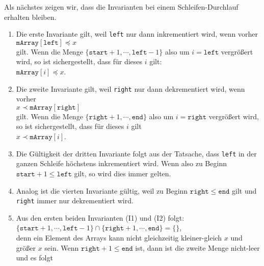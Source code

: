 \noindent
Als n\"achstes zeigen wir, dass die Invarianten bei einem Schleifen-Durchlauf erhalten
bleiben.  
\begin{enumerate}
\item Die erste Invariante gilt, weil \texttt{left} nur dann inkrementiert wird,
      wenn vorher \\[0.2cm]
      \hspace*{1.3cm} $\texttt{mArray}[\texttt{left}] \preceq x$ \\[0.2cm]
      gilt.  Wenn die Menge $\{\mathtt{start}+1, \cdots, \mathtt{left}-1\}$ also um 
      $i = \mathtt{left}$ vergr\"o{\ss}ert wird, so ist sichergestellt, dass f\"ur dieses $i$ gilt:
      \\[0.2cm]
      \hspace*{1.3cm} $\texttt{mArray}[i] \preceq x$.
\item Die zweite Invariante gilt, weil \texttt{right} nur dann dekrementiert wird,
      wenn vorher \\[0.2cm]
      \hspace*{1.3cm} $x \prec \texttt{mArray}[\texttt{right}]$ \\[0.2cm]
      gilt.  Wenn die Menge $\{\mathtt{right}+1, \cdots, \mathtt{end}\}$ also um 
      $i = \mathtt{right}$ vergr\"o{\ss}ert wird, so ist sichergestellt, dass f\"ur dieses $i$ gilt
      \\[0.2cm]
      \hspace*{1.3cm} $x \prec \texttt{mArray}[i]$.
\item Die G\"ultigkeit der dritten Invariante folgt aus der Tatsache, dass \texttt{left}
      in der ganzen Schleife h\"ochstens inkrementiert wird.  Wenn also zu Beginn 
      $\mathtt{start} + 1 \leq \mathtt{left}$ gilt, so wird dies immer gelten.  
\item Analog ist die vierten Invariante g\"ultig, weil zu Beginn $\mathtt{right} \leq \mathtt{end}$ gilt und
      \texttt{right} immer nur dekrementiert wird.
\item Aus den ersten beiden Invarianten (I1) und (I2) folgt: \\[0.2cm]
      \hspace*{1.3cm} 
      $\{ \mathtt{start}+1, \cdots, \mathtt{left} - 1 \} \cap \{ \mathtt{right}+1, \cdots, \mathtt{end} \} = \{\}$,
      \\[0.2cm]
      denn ein Element des Arrays kann nicht gleichzeitig kleiner-gleich $x$ und 
      gr\"o{\ss}er $x$ sein.
      Wenn $\texttt{right} + 1 \leq \texttt{end}$ ist, dann ist die zweite Menge
      nicht-leer und es folgt \\[0.2cm]

\end{enumerate}
